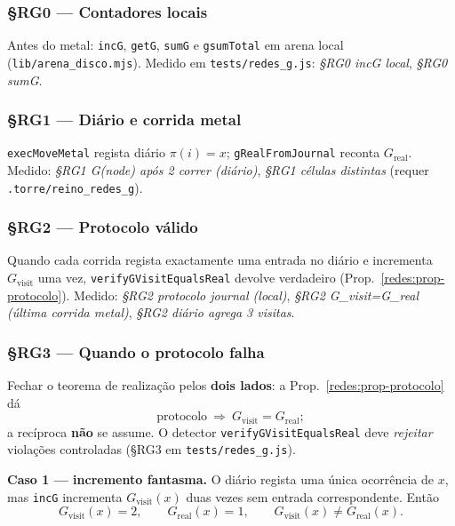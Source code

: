 \documentclass[11pt,a4paper]{article}
\newcommand{\code}[1]{\texttt{\small #1}}
\begin{document}
\subsubsection{§RG0 --- Contadores locais}\label{redes:rg0}

\noindent Antes do metal: \code{incG}, \code{getG}, \code{sumG} e \code{gsumTotal}
em arena local (\code{lib/arena\_disco.mjs}). Medido em
\code{tests/redes\_g.js}: \emph{§RG0 incG local}, \emph{§RG0 sumG}.

\subsubsection{§RG1 --- Diário e corrida metal}\label{redes:rg1}

\noindent \code{execMoveMetal} regista diário $\pi(i)=x$; \code{gRealFromJournal}
reconta $G_{\mathrm{real}}$. Medido: \emph{§RG1 G(node) após 2 correr (diário)},
\emph{§RG1 células distintas} (requer \code{.torre/reino\_redes\_g}).

\subsubsection{§RG2 --- Protocolo válido}\label{redes:rg2}

\noindent Quando cada corrida regista exactamente uma entrada no diário e incrementa
$G_{\mathrm{visit}}$ uma vez, \code{verifyGVisitEqualsReal} devolve verdadeiro
(Prop.~\ref{redes:prop-protocolo}). Medido: \emph{§RG2 protocolo journal (local)},
\emph{§RG2 G\_visit=G\_real (última corrida metal)}, \emph{§RG2 diário agrega 3 visitas}.

\subsubsection{§RG3 --- Quando o protocolo falha}\label{redes:rg3}

\noindent Fechar o teorema de realização pelos \textbf{dois lados}: a Prop.~\ref{redes:prop-protocolo}
dá
\[
\text{protocolo}\ \Longrightarrow\ G_{\mathrm{visit}}=G_{\mathrm{real}};
\]
a recíproca \textbf{não} se assume. O detector \code{verifyGVisitEqualsReal} deve
\emph{rejeitar} violações controladas (§RG3 em \code{tests/redes\_g.js}).

\medskip\noindent\textbf{Caso 1 --- incremento fantasma.} O diário regista uma
única ocorrência de $x$, mas \code{incG} incrementa $G_{\mathrm{visit}}(x)$ duas
vezes sem entrada correspondente. Então
\[
G_{\mathrm{visit}}(x)=2,\qquad G_{\mathrm{real}}(x)=1,\qquad
G_{\mathrm{visit}}(x)\neq G_{\mathrm{real}}(x).
\]
\end{document}
